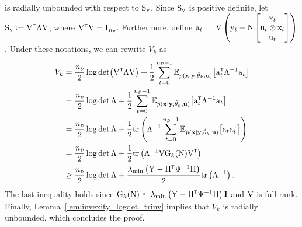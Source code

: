 is radially unbounded with respect to ${ \mathrm{S} }_{ \mathrm{v} }$. Since ${ \mathrm{S} }_{ \mathrm{v} }$ is positive definite, let $\mxS_\vcv := \mxV^\tr \Lambda \mxV$, where $\mxV^\tr \mxV = \mathbf{I}_{\Ny}$. Furthermore, define ${ \mathrm{a} }_t :=  { \mathrm{V} } \left({ \mathrm{y} }_t - { \mathrm{N} } \begin{bmatrix} { \mathrm{x} }_t\\ { \mathrm{u} }_t \otimes { \mathrm{x} }_t \\ { \mathrm{u} }_t\end{bmatrix} \right)$. Under these notations, we can rewrite $V_k$ as
\begin{align}
    V_k &= \frac{\nD}{2} \log\det (\mxV^\tr \Lambda \mxV) + \frac{1}{2} \sum_{t=0}^{\nD-1} \mathbb{E}_{p(\mathbf{x}|\mathbf{y},\hat{\vctheta}_k,\mathbf{u})} \big[ \vca_t^\tr \Lambda^{-1} \vca_t \big]\\
    &= \frac{\nD}{2} \log\det \Lambda + \frac{1}{2} \sum_{t=0}^{\nD-1} \mathbb{E}_{p(\mathbf{x}|\mathbf{y},\hat{\vctheta}_k,\mathbf{u})} \big[ \vca_t^\tr \Lambda^{-1} \vca_t \big]\\
    &= \frac{\nD}{2} \log\det \Lambda + \frac{1}{2} \trace \left( \Lambda^{-1} \sum_{t=0}^{\nD-1} \mathbb{E}_{p(\mathbf{x}|\mathbf{y},\hat{\vctheta}_k,\mathbf{u})} \big[\vca_t \vca_t^\tr \big] \right)\\
    &= \frac{\nD}{2} \log\det \Lambda + \frac{1}{2} \trace \left( \Lambda^{-1} \mxV\mxG_k(\mxN)\mxV^\tr \right)
    \\&
    \geq \frac{\nD}{2} \log\det \Lambda + \frac{\lambda_{\min} \left(\mxY - \Pi^\tr \Psi^{-1} \Pi \right)}{2} \trace \left( \Lambda^{-1} \right).
\end{align}
The last inequality holds since $\mxG_k(\mxN) \succeq \lambda_{\min} \left(\mxY - \Pi^\tr \Psi^{-1} \Pi \right)\mathbf{I}$ and ${ \mathrm{V} }$ is full rank. Finally, Lemma~\ref{lem:invexity_logdet_trinv} implies that $V_k$ is radially unbounded, which concludes the proof. 

